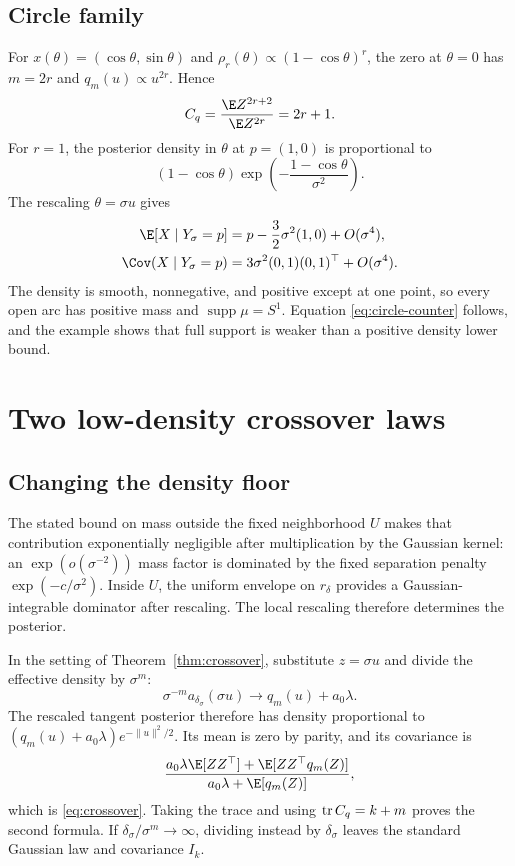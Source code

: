 \subsection{Circle family}

For $x(\theta)=(\cos\theta,\sin\theta)$ and
$\rho_r(\theta)\propto(1-\cos\theta)^r$, the zero at $\theta=0$ has
$m=2r$ and $q_m(u)\propto u^{2r}$.  Hence
\[
  C_q
  =\frac{\E Z^{2r+2}}{\E Z^{2r}}
  =2r+1.
\]
For $r=1$, the posterior density in $\theta$ at $p=(1,0)$ is proportional to
\[
  (1-\cos\theta)
  \exp\!\left(-\frac{1-\cos\theta}{\sigma^2}\right).
\]
The rescaling $\theta=\sigma u$ gives
\begin{align}
  \E[X\mid Y_\sigma=p]
  &=p-\frac32\sigma^2(1,0)+O(\sigma^4),\\
  \Cov(X\mid Y_\sigma=p)
  &=3\sigma^2(0,1)(0,1)^\top+O(\sigma^4).
\end{align}
The density is smooth, nonnegative, and positive except at one point, so every open arc has positive mass and $\operatorname{supp}\mu=S^1$.  Equation \eqref{eq:circle-counter} follows, and the example shows that full support is weaker than a positive density lower bound.

\section{Two low-density crossover laws}
\label{app:crossovers}

\subsection{Changing the density floor}

The stated bound on mass outside the fixed neighborhood $U$ makes that contribution exponentially negligible after multiplication by the Gaussian kernel: an $\exp(o(\sigma^{-2}))$ mass factor is dominated by the fixed separation penalty $\exp(-c/\sigma^2)$.  Inside $U$, the uniform envelope on $r_\delta$ provides a Gaussian-integrable dominator after rescaling.  The local rescaling therefore determines the posterior.

In the setting of Theorem~\ref{thm:crossover}, substitute $z=\sigma u$ and divide the effective density by $\sigma^m$:
\[
  \sigma^{-m}a_{\delta_\sigma}(\sigma u)
  \longrightarrow q_m(u)+a_0\lambda.
\]
The rescaled tangent posterior therefore has density proportional to
$(q_m(u)+a_0\lambda)e^{-\|u\|^2/2}$.  Its mean is zero by parity, and its covariance is
\[
  \frac{a_0\lambda\E[ZZ^\top]+\E[ZZ^\top q_m(Z)]}
  {a_0\lambda+\E[q_m(Z)]},
\]
which is \eqref{eq:crossover}.  Taking the trace and using
$\operatorname{tr} C_q=k+m$ proves the second formula.  If
$\delta_\sigma/\sigma^m\to\infty$, dividing instead by $\delta_\sigma$ leaves the standard Gaussian law and covariance $I_k$.

